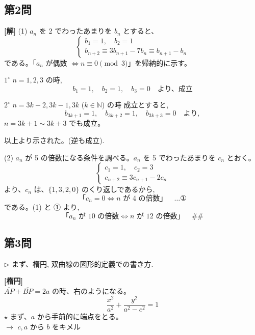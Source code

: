 \documentclass[../main.tex]{subfiles}
\begin{document}
\subsection*{第2問}

\noindent
\textbf{[解]} (1) $a_n$ を 2 でわったあまりを $b_n$ とすると、
\[
  \begin{cases}
    b_1 = 1, \quad b_2 = 1 \\
    b_{n+2} \equiv 3b_{n+1} - 7b_n \equiv b_{n+1} - b_n
  \end{cases}
\]
である。「$a_n$ が偶数 $\iff n \equiv 0 \pmod 3$」を帰納的に示す。

$1^\circ$ $n=1,2,3$ の時,
\[
  b_1 = 1, \quad b_2 = 1, \quad b_3 = 0 \quad \text{より、成立}
\]

$2^\circ$ $n = 3k-2, 3k-1, 3k$ ($k \in \mathbb{N}$) の時 成立とすると,
\[
  b_{3k+1} = 1, \quad b_{3k+2} = 1, \quad b_{3k+3} = 0 \quad \text{より},
\]
$n = 3k+1 \sim 3k+3$ でも成立。

以上より示された。(逆も成立).

\bigskip
\noindent
(2) $a_n$ が 5 の倍数になる条件を調べる。$a_n$ を 5 でわったあまりを $c_n$ とおく。
\[
  \begin{cases}
    c_1 = 1, \quad c_2 = 3 \\
    c_{n+2} \equiv 3c_{n+1} - 2c_n
  \end{cases}
\]
より、$c_n$ は、$\{1, 3, 2, 0\}$ のくり返しであるから,
\[
  \text{「} c_n = 0 \iff n \text{ が 4 の倍数} \text{」} \quad \dots \text{①}
\]
である。(1) と ① より,
\[
  \text{「} a_n \text{ が 10 の倍数} \iff n \text{ が 12 の倍数} \text{」} \quad \text{\#\#}
\]

\newpage

\subsection*{第3問}

\noindent
$\triangleright$ まず、楕円, 双曲線の図形的定義での書き方.

\begin{framed}
  \noindent
  \textbf{[楕円]}\\
  $\overline{AP} + \overline{BP} = 2a$ の時、右のようになる。
  \[
    \frac{x^2}{a^2} + \frac{y^2}{a^2-c^2} = 1
  \]
  $\star$ まず、$a$ から手前的に端点をとる。\\
  $\longrightarrow$ $c, a$ から $b$ をキメル

  \begin{center}
  \end{center}
\end{framed}
\end{document}
